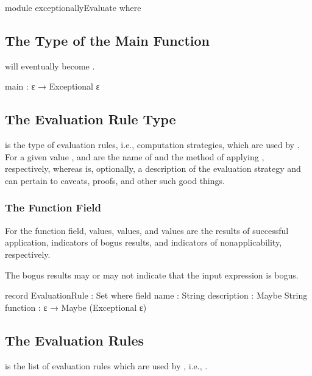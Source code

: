 \documentclass{report}
\begin{document}
\begin{code}
  module exceptionallyEvaluate where
\end{code}

\subsection{The Type of the Main Function}
 will eventually become .

\begin{code}
    main : ε → Exceptional ε
\end{code}

\subsection{The Evaluation Rule Type}
 is the type of evaluation rules, i.e., computation strategies, which are used by .  For a given  value ,   and   are the name of  and the method of applying , respectively, whereas   is, optionally, a description of the  evaluation strategy and can pertain to caveats, proofs, and other such good things.

\subsubsection{The Function Field}
For the function field,    values,    values, and  values are the results of successful application, indicators of bogus results, and indicators of nonapplicability, respectively.

The bogus results may or may not indicate that the input expression is bogus.

\begin{code}
    record EvaluationRule : Set where
      field
        name : String
        description : Maybe String
        function : ε → Maybe (Exceptional ε)
\end{code}

\subsection{The Evaluation Rules}
 is the list of evaluation rules which are used by , i.e., .
\end{document}
